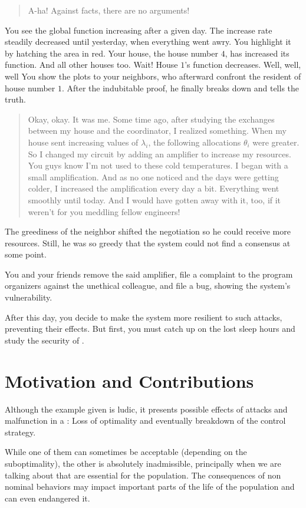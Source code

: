 \documentclass[../main.tex]{subfiles}
\begin{document}
\begin{quote}
  A-ha! Against facts, there are no arguments!
\end{quote}
You see the global function increasing after a given day. The increase rate steadily decreased until yesterday, when everything went awry.
You highlight it by hatching the area in red.
Your house, the house number $4$, has increased its function. And all other houses too. Wait! House $1$'s function decreases. Well, well, well \textellipsis
You show the plots to your neighbors, who afterward confront the resident of house number $1$.
After the indubitable proof, he finally breaks down and tells the truth.
\begin{quote}
  \raggedright
  Okay, okay. It was me. Some time ago, after studying the exchanges between my house and the coordinator, I realized something.
When my house sent increasing values of $\lambda_{i}$, the following allocations $\theta_{i}$ were greater.
  So I changed my circuit by adding an amplifier to increase my resources.
  You guys know I'm not used to these cold temperatures.
  I began with a small amplification.
And as no one noticed and the days were getting colder, I increased the amplification every day a bit.
  Everything went smoothly until today.
  And I would have gotten away with it, too, if it weren't for you meddling fellow engineers!
\end{quote}
The greediness of the neighbor shifted the negotiation so he could receive more resources.
Still, he was so greedy that the system could not find a consensus at some point.

You and your friends remove the said amplifier, file a complaint to the program organizers against the unethical colleague, and file a bug, showing the system's vulnerability.

After this day, you decide to make the system more resilient to such attacks, preventing their effects.
But first, you must catch up on the lost sleep hours and study the security of \cps{}.

\section{Motivation and Contributions}
Although the example given is ludic, it presents possible effects of attacks and malfunction in a \cps{}: Loss of optimality and eventually breakdown of the control strategy.

While one of them can sometimes be acceptable (depending on the suboptimality), the other is absolutely inadmissible, principally when we are talking about \cps{} that are essential for the population.
The consequences of non nominal behaviors may impact important parts of the life of the population and can even endangered it.
\end{document}
